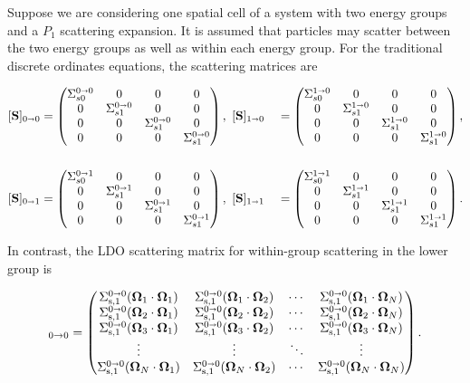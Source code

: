 Suppose we are considering one spatial cell of a system with two energy groups and a 
$P_1$ scattering expansion. It is assumed that particles may scatter between the two 
energy groups as well as within each energy group. For the traditional discrete 
ordinates equations, the scattering matrices are

\begin{alignat}{2}
  [\ve{S}]_{0\sa0} &= \begin{pmatrix}
    \Sigma^{0\sa0}_{s0} & 0 & 0 & 0 \\
    0 & \Sigma^{0\sa0}_{s1} & 0 & 0 \\
    0 & 0 & \Sigma^{0\sa0}_{s1} & 0 \\
    0 & 0 & 0 & \Sigma^{0\sa0}_{s1}
  \end{pmatrix},\ 
  [\ve{S}]_{1\sa0} &= \begin{pmatrix}
    \Sigma^{1\sa0}_{s0} & 0 & 0 & 0 \\
    0 & \Sigma^{1\sa0}_{s1} & 0 & 0 \\
    0 & 0 & \Sigma^{1\sa0}_{s1} & 0 \\
    0 & 0 & 0 & \Sigma^{1\sa0}_{s1}
  \end{pmatrix}, \nonumber
\\  \label{scatter_exp_denovo}
\\
  [\ve{S}]_{0\sa1} &= \begin{pmatrix}
    \Sigma^{0\sa1}_{s0} & 0 & 0 & 0 \\
    0 & \Sigma^{0\sa1}_{s1} & 0 & 0 \\
    0 & 0 & \Sigma^{0\sa1}_{s1} & 0 \\
    0 & 0 & 0 & \Sigma^{0\sa1}_{s1}
  \end{pmatrix},\ 
  [\ve{S}]_{1\sa1}\ &= \begin{pmatrix}
    \Sigma^{1\sa1}_{s0} & 0 & 0 & 0 \\
    0 & \Sigma^{1\sa1}_{s1} & 0 & 0 \\
    0 & 0 & \Sigma^{1\sa1}_{s1} & 0 \\
    0 & 0 & 0 & \Sigma^{1\sa1}_{s1}
  \end{pmatrix}. \nonumber
\end{alignat}

\noindent In contrast, the LDO scattering matrix for within-group scattering in the
lower group is

\begin{equation}
  [\ve{\tilde{S}}]_{0\rightarrow 0} = \begin{pmatrix}
    \Snz{1}{1}{1} & \Snz{1}{1}{2} & \cdots & \Snz{1}{1}{N} \\
    \Snz{1}{2}{1} & \Snz{1}{2}{2} & \cdots & \Snz{1}{2}{N} \\
    \Snz{1}{3}{1} & \Snz{1}{3}{2} & \cdots & \Snz{1}{3}{N} \\
    \vdots        & \vdots        & \ddots & \vdots        \\
    \Snz{1}{N}{1} & \Snz{1}{N}{2} & \cdots & \Snz{1}{N}{N} \\
  \end{pmatrix}.
\label{scatter_exp_ldo}
\end{equation}

